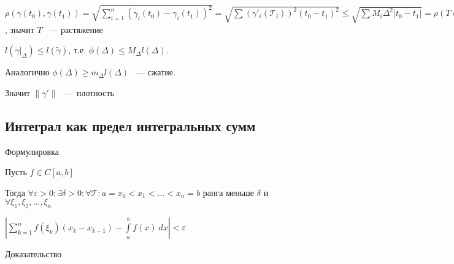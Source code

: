 \documentclass[../main.tex]{subfiles}
\begin{document}
            $\rho(\gamma(t_0), \gamma(t_1)) = \sqrt{\sum\limits_{i = 1}^n (\gamma_i(t_0) - \gamma_i(t_1))^2} = \sqrt{\sum(\gamma'_i(\mathcal{T}_i))^2(t_0 - t_1)^2} \leq \sqrt{\sum M_i{\Delta}^2 |t_0 - t_1|} = \rho(T(\gamma(t_0)), T(\gamma(t_1)))$, значит $T$ ~--- растяжение
            
            $l\left( \gamma|_{\Delta} \right) \leq l(\widetilde{\gamma})$, т.е. $\phi(\Delta) \leq M_{\Delta} l(\Delta)$.
            
            Аналогично $\phi(\Delta) \geq m_{\Delta}l(\Delta)$ ~--- сжатие.
            
            Значит $\| \gamma' \|$ ~--- плотность

\newpage


\subsection{Интеграл как предел интегральных сумм}
Формулировка 
$$$$

			Пусть $f \in C[a, b]$

			Тогда $\forall \varepsilon > 0 : \exists \delta > 0 : \forall \mathcal{T} : a = x_0 < x_1 < \ldots < x_n = b$ ранга меньше $\delta$ и $\forall \xi_1, \xi_2, \ldots, \xi_n$

			$\left| \sum\limits^n_{k = 1} f(\xi_k)(x_k - x_{k - 1}) - \int\limits^b_a f(x) \ dx \right| < \varepsilon$

$$$$
Доказательство 
$$$$
\end{document}
